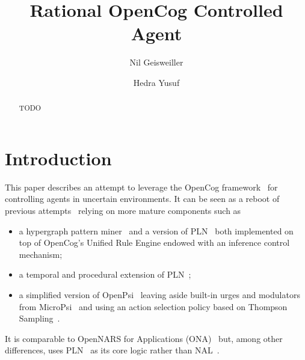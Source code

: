 \documentclass[runningheads]{llncs}
\begin{document}
%
\title{Rational OpenCog Controlled Agent}

%
\author{Nil Geisweiller
  \and Hedra Yusuf}
%
%
%
\maketitle              %
%

\begin{abstract}
  
  TODO

\end{abstract}

\section{Introduction}

This paper describes an attempt to leverage the OpenCog
framework~\cite{Hart2008} for controlling agents in uncertain
environments.  It can be seen as a reboot of previous
attempts~\cite{Goertzel2008, Goertzel2011, Cai2011, Cai2013} relying
on more mature components such as
\begin{itemize}
\item a hypergraph pattern miner~\cite{Geisweiller2019} and a version
  of PLN~\cite{Goertzel2009} both implemented on top of OpenCog's
  Unified Rule Engine endowed with an inference control mechanism;
\item a temporal and procedural extension of
  PLN~\cite{Geisweiller2023TPLN};
\item a simplified version of OpenPsi~\cite{Cai2011, Cai2013} leaving
  aside built-in urges and modulators from MicroPsi~\cite{Bach2012}
  and using an action selection policy based on Thompson
  Sampling~\cite{Leike2016}.
\end{itemize}
It is comparable to OpenNARS for Applications (ONA)~\cite{Hammer2020}
but, among other differences, uses PLN~\cite{Goertzel2009} as its core
logic rather than NAL~\cite{Wang2011}.
\end{document}
